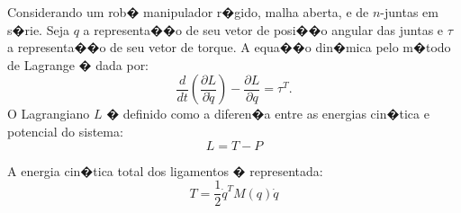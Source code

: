 Considerando um rob� manipulador r�gido, malha aberta, e de $n$-juntas em s�rie. Seja $q$ a representa��o de seu vetor de posi��o angular das juntas  e $\tau$ a representa��o de seu vetor de torque. A equa��o din�mica pelo m�todo de
Lagrange � dada por:
\begin{equation} \label{eq:lagr1}
\frac{d}{dt}(\frac{\partial L}{\partial \dot{q}})-\frac{\partial L}{\partial q}=\tau^{T}.
\end{equation}
O Lagrangiano $L$ � definido como a diferen�a entre as energias cin�tica e potencial do sistema:
\begin{equation} \label{L}
L=T-P
\end{equation}

A energia cin�tica total dos ligamentos � representada:
\begin{equation} \label{energT}
T=\frac{1}{2}\dot{q}^{T}M(q)\dot{q}
\end{equation}
